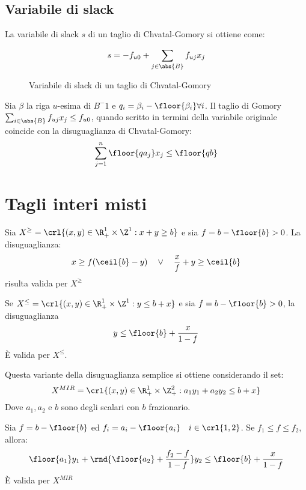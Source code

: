 \documentclass[\main/main.tex]{subfiles}
\begin{document}
\subsection{Variabile di slack}
La variabile di slack \(s\) di un taglio di Chvatal-Gomory si ottiene come:

\begin{figure}
    \[
        s = -f_{u0} + \sum_{j \in \abs{B}} f_{uj}x_{j}
    \]
    \caption{Variabile di slack di un taglio di Chvatal-Gomory}
\end{figure}

\begin{proposition}
    Sia \(\beta \) la riga \(u\)-esima di \(B^-1\) e \(q_i = \beta_i - \floor{\beta_i} \forall i\). Il taglio di Gomory \(\sum_{i \in \abs{B}} f_{uj}x_j \leq f_{u0}\), quando scritto in termini della variabile originale coincide con la disuguaglianza di Chvatal-Gomory:
    \[
        \sum_{j=1}^n \floor{qa_j}x_j \leq \floor{qb}
    \]
\end{proposition}

\section{Tagli interi misti}
\begin{proposition}
    Sia \(X^{\geq} = \crl{(x,y) \in \R^1_+ \times \Z^1: x+y \geq b}\) e sia \(f = b - \floor{b} > 0\). La disuguaglianza:
    \[
        x \geq f(\ceil{b}-y) \quad \lor \quad \frac{x}{f} + y \geq \ceil{b}
    \]
    risulta valida per \(X^{\geq}\)
\end{proposition}

\begin{corollary}
    Se \(X^{\leq} = \crl{(x,y) \in \R^1_+ \times \Z^1: y \leq b + x}\) e sia \(f = b - \floor{b} > 0\), la disuguaglianza
    \[
        y \leq \floor{b} + \frac{x}{1-f}
    \]
    È valida per \(X^{\leq}\).
\end{corollary}

\begin{proposition}
    Questa variante della disuguaglianza semplice si ottiene considerando il set:
    \[
        X^{MIR} = \crl{(x,y) \in \R^1_+ \times \Z^2_+: a_1y_1 + a_2y_2 \leq b+x}
    \]
    Dove \(a_1, a_2\) e \(b\) sono degli scalari con \(b\) frazionario.

    Sia \(f = b - \floor{b}\) ed \(f_i = a_i - \floor{a_i} \quad i \in \crl{1,2}\). Se \(f_1 \leq f \leq f_2\), allora:
    \[
        \floor{a_1}y_1 + \rnd{\floor{a_2} + \frac{f_2 - f}{1-f}}y_2 \leq \floor{b} + \frac{x}{1-f}
    \]
    È valida per \(X^{MIR}\)
\end{proposition}
\end{document}
